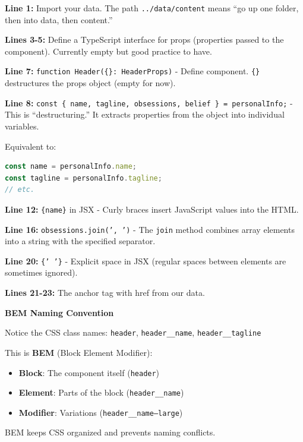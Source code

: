 \documentclass[12pt,a4paper]{article}
\begin{document}
\begin{explanation}
\textbf{Line 1:} Import your data. The path \texttt{../data/content} means ``go up one folder, then into data, then content.''

\textbf{Lines 3-5:} Define a TypeScript interface for props (properties passed to the component). Currently empty but good practice to have.

\textbf{Line 7:} \texttt{function Header(\{\}: HeaderProps)} - Define component. \texttt{\{\}} destructures the props object (empty for now).

\textbf{Line 8:} \texttt{const \{ name, tagline, obsessions, belief \} = personalInfo;} - This is ``destructuring.'' It extracts properties from the object into individual variables.

Equivalent to:
\begin{lstlisting}[language=JavaScript]
const name = personalInfo.name;
const tagline = personalInfo.tagline;
// etc.
\end{lstlisting}

\textbf{Line 12:} \texttt{\{name\}} in JSX - Curly braces insert JavaScript values into the HTML.

\textbf{Line 16:} \texttt{obsessions.join(', ')} - The \texttt{join} method combines array elements into a string with the specified separator.

\textbf{Line 20:} \texttt{\{' '\}} - Explicit space in JSX (regular spaces between elements are sometimes ignored).

\textbf{Lines 21-23:} The anchor tag with href from our data.
\end{explanation}

\begin{concept}
\textbf{BEM Naming Convention}

Notice the CSS class names: \texttt{header}, \texttt{header\_\_name}, \texttt{header\_\_tagline}

This is \textbf{BEM} (Block Element Modifier):
\begin{itemize}
    \item \textbf{Block}: The component itself (\texttt{header})
    \item \textbf{Element}: Parts of the block (\texttt{header\_\_name})
    \item \textbf{Modifier}: Variations (\texttt{header\_\_name--large})
\end{itemize}

BEM keeps CSS organized and prevents naming conflicts.
\end{concept}
\end{document}
